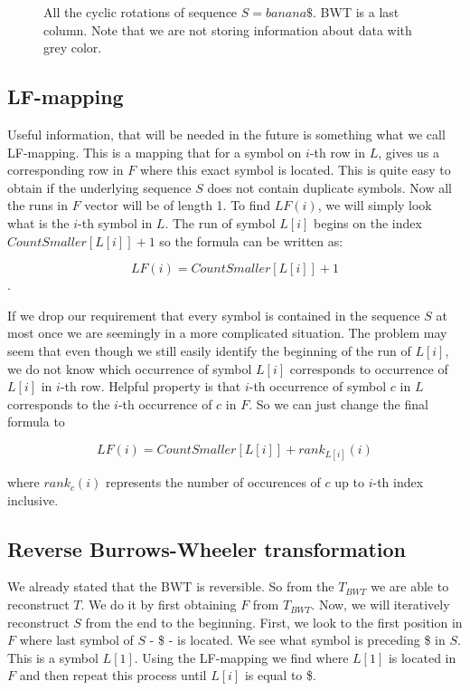 \begin{figure}
{	}
	\caption[TODO]{All the cyclic rotations of sequence $S = banana\$$. BWT is a last column. Note that we are not storing information about data with grey color.}
	\label{obr:BWT}
\end{figure}

\subsection{LF-mapping}

Useful information, that will be needed in the future is something what we call LF-mapping.
This is a mapping that for a symbol on $i$-th row in $L$, gives us a corresponding row in $F$
where this exact symbol is located. This is quite easy to obtain if the underlying sequence $S$
does not contain duplicate symbols. Now all the runs in $F$ vector will be of length 1.
To find $LF(i)$, we will simply look what is the $i$-th symbol in $L$. The run of
symbol $L[i]$ begins on the index $CountSmaller[L[i]] + 1$ so the formula can be written as:

$$LF(i) = CountSmaller[L[i]] + 1$$.

If we drop our requirement that every symbol is contained in the sequence $S$ at most once
we are seemingly in a more complicated situation. The problem may seem that even
though we still easily identify the beginning of the run of $L[i]$, we do not
know which occurrence of symbol $L[i]$ corresponds to occurrence of $L[i]$ in $i$-th row.
Helpful property is that $i$-th occurrence of symbol $c$ in $L$ corresponds to the
$i$-th occurrence of $c$ in $F$. So we can just change the final formula to

				$$LF(i) = CountSmaller[L[i]] + rank_{L[i]}(i)$$

where $rank_c(i)$ represents the number of occurences of $c$ up to $i$-th index inclusive.

\subsection{Reverse Burrows-Wheeler transformation}

We already stated that the BWT is reversible. So from the $T_{BWT}$ we are able to reconstruct
$T$. We do it by first obtaining $F$ from $T_{BWT}$. Now, we will iteratively reconstruct $S$
from the end to the beginning. First, we look to the first position in $F$ where last symbol
of $S$ - \$ - is located. We see what symbol is preceding \$ in $S$. This is a symbol
$L[1]$. Using the LF-mapping we find where $L[1]$ is located in $F$ and then repeat this process
until $L[i]$ is equal to \$.


